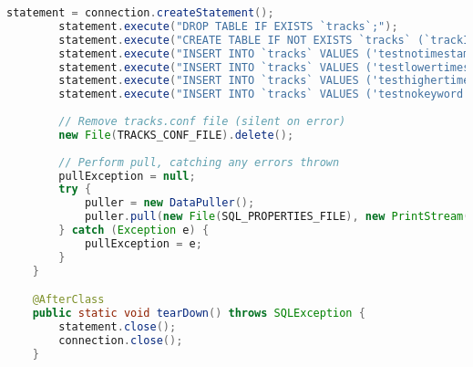 \begin{lstlisting}[language=Java,basicstyle=\tiny,caption=DataPullerTest.java]
        statement = connection.createStatement();
        statement.execute("DROP TABLE IF EXISTS `tracks`;");
        statement.execute("CREATE TABLE IF NOT EXISTS `tracks` (`trackId` varchar(32) NOT NULL, `trackTypeId` varchar(32) NOT NULL DEFAULT 'angkot', `trackName` varchar(64) NOT NULL, `internalInfo` varchar(1024) NOT NULL, `geodata` linestring DEFAULT NULL, `pathloop` tinyint(1) NOT NULL DEFAULT '0', `penalty` decimal(4,2) NOT NULL DEFAULT '1.00', `transferNodes` varchar(1024) DEFAULT NULL, `extraParameters` varchar(256) DEFAULT NULL, `officialTrackNo` varchar(32) DEFAULT NULL, `officialTrackName` varchar(256) DEFAULT NULL) ENGINE=InnoDB DEFAULT CHARSET=latin1;");
        statement.execute("INSERT INTO `tracks` VALUES ('testnotimestamp', 'bdo_angkot', 'Test for timestamp is not yet specified', 'angkotwebid:642', GeomFromText(NULL), '0', '1.00', NULL, NULL, '1A', 'Abdul Muis - Cicaheum (via Binong)');");
        statement.execute("INSERT INTO `tracks` VALUES ('testlowertimestamp', 'bdo_angkot', 'Test for timestamp is lower than today', 'angkotwebid:641:808628400', GeomFromText('POINT(107.60380 -6.91082)'), '0', '1.00', NULL, NULL, '1B', 'Abdul Muis - Cicaheum (via Aceh)');");
        statement.execute("INSERT INTO `tracks` VALUES ('testhighertimestamp', 'bdo_angkot', 'Test for timestamp is higher than today', 'angkotwebid:109:2386551600', GeomFromText('LINESTRING(107.6038 -6.91082)'), '0', '1.00', NULL, NULL, '1B', 'Abdul Muis - Cicaheum (via Aceh)');");
        statement.execute("INSERT INTO `tracks` VALUES ('testnokeyword', 'bdo_angkot', 'Test for no keyword is used', 'Not an angkotwebid track', GeomFromText('LINESTRING(107.6038 -6.91082)'), '0', '1.00', NULL, NULL, NULL, NULL);");
        
        // Remove tracks.conf file (silent on error)
        new File(TRACKS_CONF_FILE).delete();
        
        // Perform pull, catching any errors thrown
        pullException = null;
        try {
            puller = new DataPuller();
            puller.pull(new File(SQL_PROPERTIES_FILE), new PrintStream(new FileOutputStream(TRACKS_CONF_FILE)));
        } catch (Exception e) {
            pullException = e;
        }
    }

    @AfterClass
    public static void tearDown() throws SQLException {
        statement.close();
        connection.close();
    }
    

\end{lstlisting}
